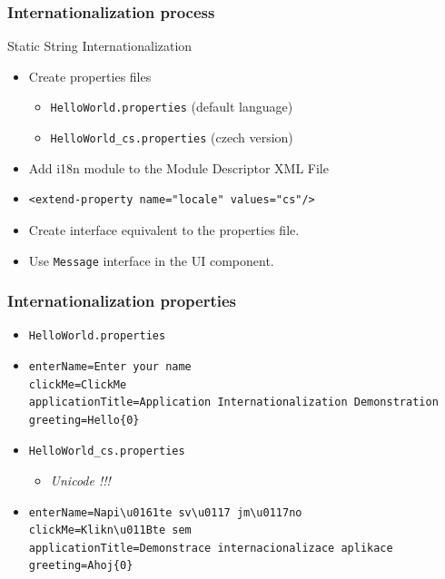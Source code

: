 \documentclass[10pt,table, xcolor=pdflatex]{beamer}
\newcommand{\itmspace}[2]{\item #2 \vspace{#1}}
\begin{document}
\begin{frame}[fragile]\frametitle{Internationalization process}
Static String Internationalization
	\begin{itemize}
		\item Create properties files
          \begin{itemize}
        	\item \texttt{HelloWorld.properties} {\footnotesize(default language)}
            \itmspace{.5em} {\texttt{HelloWorld\_cs.properties} {\footnotesize(czech version)}}
          \end{itemize}
		\item Add i18n module to the Module Descriptor XML File
        \item[]
            \lstset{language=XML, basicstyle=\ttfamily}
            \begin{lstlisting}
<extend-property name="locale" values="cs"/>
            \end{lstlisting}
        \item Create interface equivalent to the properties file.
        \item Use \texttt{Message} interface in the UI component.
	\end{itemize}
\end{frame}


\begin{frame}[fragile]\frametitle{Internationalization properties}
	\begin{itemize}
		\item \texttt{HelloWorld.properties}
		\item[]
        	\footnotesize
        	\begin{verbatim}
enterName=Enter your name
clickMe=ClickMe
applicationTitle=Application Internationalization Demonstration
greeting=Hello{0}
        	\end{verbatim}
            \normalsize
		\item \texttt{HelloWorld\_cs.properties} 
          \begin{itemize}
            \item \emph{Unicode !!!}
          \end{itemize}
       	\item[]
        	\footnotesize
        	\begin{verbatim}
enterName=Napi\u0161te sv\u0117 jm\u0117no
clickMe=Klikn\u011Bte sem
applicationTitle=Demonstrace internacionalizace aplikace
greeting=Ahoj{0}
        	\end{verbatim}
            \normalsize
	\end{itemize}
\end{frame}
\end{document}
